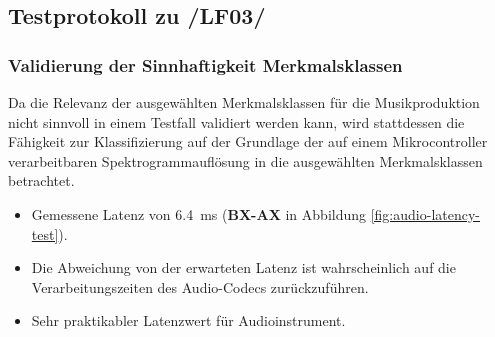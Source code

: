 \subsection{Testprotokoll zu /LF03/}

\subsubsection{Validierung der Sinnhaftigkeit Merkmalsklassen}
Da die Relevanz der ausgewählten Merkmalsklassen für die Musikproduktion nicht sinnvoll in einem Testfall validiert werden kann, wird stattdessen die Fähigkeit zur Klassifizierung auf der Grundlage der auf einem Mikrocontroller verarbeitbaren Spektrogrammauflösung in die ausgewählten Merkmalsklassen betrachtet.





\label{test-latenzmessung}

\begin{itemize}
	\item Gemessene Latenz von \SI{6.4}{\milli\second} (\textbf{BX-AX} in Abbildung  \ref{fig:audio-latency-test}).
	\item Die Abweichung von der erwarteten Latenz ist wahrscheinlich auf die Verarbeitungszeiten des Audio-Codecs zurückzuführen.
	\item Sehr praktikabler Latenzwert für Audioinstrument.
\end{itemize}